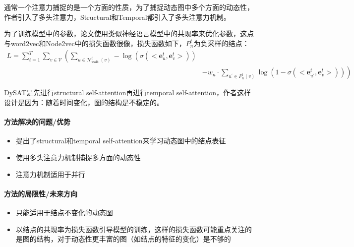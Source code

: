 通常一个注意力捕捉的是一个方面的性质，为了捕捉动态图中多个方面的动态性，作者引入了多头注意力，Structural和Temporal都引入了多头注意力机制。

为了训练模型中的参数，论文使用类似神经语言模型中的共现率来优化参数，这点与word2vec和Node2vec中的损失函数很像，损失函数如下，$P_n^t$为负采样的结点：
$$
\begin{aligned}
	L=\sum_{t=1}^{T} \sum_{v \in \mathcal{V}}\left(\sum_{u \in \mathcal{N}_{\text {walk }}^{t}(v)}-\log \left(\sigma\left(<\boldsymbol{e}_{u}^{t}, \boldsymbol{e}_{v}^{t}>\right)\right)\right.\\
	&\left.-w_{n} \cdot \sum_{u^{\prime} \in P_{n}^{t}(v)} \log \left(1-\sigma\left(<\boldsymbol{e}_{u^{\prime}}^{t}, \boldsymbol{e}_{v}^{t}>\right)\right)\right)
\end{aligned}
$$

DySAT是先进行structural self-attention再进行temporal self-attention，作者这样设计是因为：随着时间变化，图的结构是不稳定的。

\paragraph{方法解决的问题/优势}

\begin{itemize}

	\item 提出了structural和temporal self-attention来学习动态图中的结点表征
	\item 使用多头注意力机制捕捉多方面的动态性
	\item 注意力机制适用于并行

\end{itemize}

\paragraph{方法的局限性/未来方向}

\begin{itemize}

	\item 只能适用于结点不变化的动态图
	\item 以结点的共现率为损失函数引导模型的训练，这样的损失函数可能重点关注的是图的结构，对于动态性更丰富的图（如结点的特征的变化）是不够的

\end{itemize}


